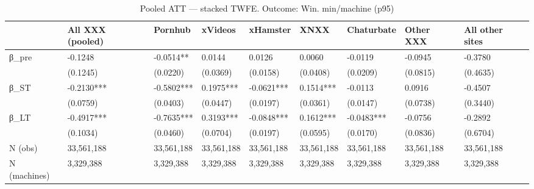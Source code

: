 \begin{table}

\caption{Pooled ATT — stacked TWFE. Outcome: Win. min/machine (p95)}
\centering
\begin{tabular}[t]{lllllllll}
\toprule
  & All XXX (pooled) & Pornhub & xVideos & xHamster & XNXX & Chaturbate & Other XXX & All other sites\\
\midrule
β\_pre & -0.1248 & -0.0514** & 0.0144 & 0.0126 & 0.0060 & -0.0119 & -0.0945 & -0.3780\\
 & (0.1245) & (0.0220) & (0.0369) & (0.0158) & (0.0408) & (0.0209) & (0.0815) & (0.4635)\\
β\_ST & -0.2130*** & -0.5802*** & 0.1975*** & -0.0621*** & 0.1514*** & -0.0113 & 0.0916 & -0.4507\\
 & (0.0759) & (0.0403) & (0.0447) & (0.0197) & (0.0361) & (0.0147) & (0.0738) & (0.3440)\\
β\_LT & -0.4917*** & -0.7635*** & 0.3193*** & -0.0848*** & 0.1612*** & -0.0483*** & -0.0756 & -0.2892\\
\addlinespace
 & (0.1034) & (0.0460) & (0.0704) & (0.0197) & (0.0595) & (0.0170) & (0.0836) & (0.6704)\\
N (obs) & 33,561,188 & 33,561,188 & 33,561,188 & 33,561,188 & 33,561,188 & 33,561,188 & 33,561,188 & 33,561,188\\
N (machines) & 3,329,388 & 3,329,388 & 3,329,388 & 3,329,388 & 3,329,388 & 3,329,388 & 3,329,388 & 3,329,388\\
\bottomrule
\end{tabular}
\end{table}
